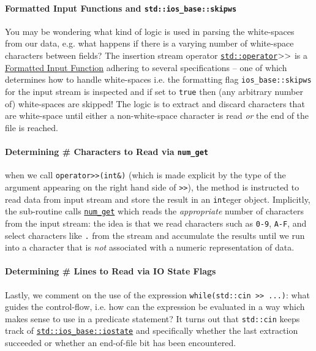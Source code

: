 \documentclass[12pt,letterpaper,twoside]{article}
\begin{document}
\paragraph{Formatted Input Functions and \texttt{std::ios\_base::skipws}} 
You may be wondering what kind of logic is used in 
parsing the white-spaces from our data, e.g. what happens if there is a varying number of 
white-space characters between fields? The insertion stream operator 
\href{https://en.cppreference.com/w/cpp/io/basic_istream/operator_gtgt}
{\texttt{std::operator$>\vspace{-1pt}>$}} is a \href{https://en.cppreference.com/w/cpp/named_req/FormattedInputFunction}{Formatted Input Function} adhering to several specifications -- one of which determines how to handle white-spaces i.e. the formatting flag 
\texttt{ios\_base::skipws} for the input stream is inspected and if set to \texttt{true} 
then (any arbitrary number of) white-spaces are skipped! The logic is to extract and 
discard characters that are 
white-space until either a non-white-space character is read \emph{or} the end of the 
file is reached.

\paragraph{Determining \# Characters to Read via \texttt{num\_get}}
when we call \texttt{operator>>(int\&)} (which is made explicit by the type of the argument appearing on the right hand side of \texttt{>>}), 
the method is instructed to read data
from input stream and store the result in an \texttt{int}eger object. Implicitly, the 
sub-routine calls \href{https://en.cppreference.com/w/cpp/locale/num_get/get}
{\texttt{num\_get}} which reads the \emph{appropriate} number of characters from the input 
stream: the idea is that we read characters such as \texttt{0-9}, \texttt{A-F}, and select characters like \texttt{.} from the stream and 
accumulate the results until we run into a character that is \emph{not} associated with
a numeric representation of data.

\paragraph{Determining \# Lines to Read via IO State Flags} Lastly, we comment
on the use of the expression \texttt{while(std::cin >> ...)}: what guides the control-flow,
i.e. how can the expression be evaluated in a way which makes sense to use in a predicate
statement? It turns out that \texttt{std::cin} keeps track of 
\href{https://en.cppreference.com/w/cpp/io/ios_base/iostate}
{\texttt{std::ios\_base::iostate}} and specifically whether the last extraction succeeded
or whether an end-of-file bit has been encountered.
\end{document}
